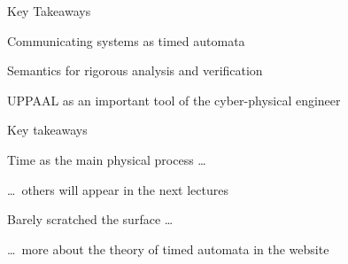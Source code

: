\documentclass{beamer}
\begin{document}
\begin{frame}{Key Takeaways}

        Communicating systems as  \alert{timed automata} 


        \vspace{0.5cm}
        \alert{Semantics} for rigorous analysis and verification

        \vspace{1cm}
        \alert{UPPAAL} as an important tool of the cyber-physical engineer
\end{frame}

\begin{frame}{Key takeaways}


        \vspace{0.4cm}
        \alert{Time} as the main physical process \dots

        \dots\ others will appear in the next lectures

        \vspace{0.4cm}
        Barely scratched the surface \dots

        \dots\ more about the theory of timed automata 
        in the website
\end{frame}
\end{document}
